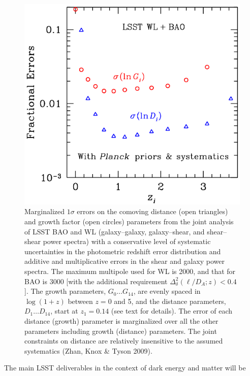 \documentclass{emulateapj}
\begin{document}
\begin{figure}
\includegraphics[width=1.0\hsize,clip]{dges.pdf}
\caption{Marginalized $1\sigma$ errors on the comoving distance 
(open triangles) and growth factor (open circles) parameters from 
the joint analysis of LSST BAO and WL (galaxy--galaxy, galaxy--shear,
and shear--shear power spectra) with a 
conservative level of systematic uncertainties in the photometric redshift error 
distribution and additive and multiplicative errors in the shear and 
galaxy power spectra. The maximum multipole used for WL is 
2000, and that for BAO is 3000 [with the additional requirement
$\Delta_\delta^2(\ell/D_{A};z) < 0.4$].
The growth parameters, $G_0 \ldots G_{14}$, are evenly spaced in 
$\log(1+z)$ between $z = 0$ and 5, and the distance parameters, 
$D_1 \ldots D_{14}$, start at $z_1 = 0.14$ (see text for details).
The error of each distance (growth) parameter is marginalized 
over all the other parameters including growth (distance) parameters. The joint constraints on 
distance are relatively insensitive to the assumed systematics
(Zhan, Knox \& Tyson 2009).} 
\label{Fig:bao2}
\end{figure}


The main LSST deliverables in the context of dark energy and matter will be
\end{document}
